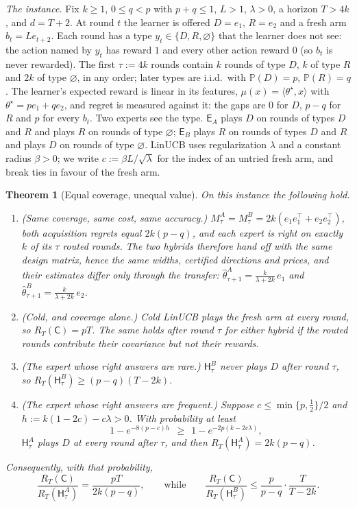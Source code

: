\documentclass{article}
\newtheorem{theorem}{Theorem}
\theoremstyle{definition}
\theoremstyle{remark}
\newcommand{\Prb}{\mathbb{P}}
\theoremstyle{remark}
\newcommand{\Cold}{\mathsf{C}}
\newcommand{\Exp}{\mathsf{E}}
\newcommand{\Hyb}{\mathsf{H}}
\begin{document}
\emph{The instance.} Fix $k\ge1$, $0\le q<p$ with $p+q\le1$, $L>1$,
$\lambda>0$, a horizon $T>4k$, and $d=T+2$. At round $t$ the learner is
offered $D=e_1$, $R=e_2$ and a fresh arm $b_t=Le_{t+2}$. Each round has a type
$y_t\in\{D,R,\varnothing\}$ that the learner does not see: the action named by
$y_t$ has reward $1$ and every other action reward $0$ (so $b_t$ is never
rewarded). The first $\tau:=4k$ rounds contain $k$ rounds of type $D$, $k$ of
type $R$ and $2k$ of type $\varnothing$, in any order; later types are
i.i.d.\ with $\Prb(D)=p$, $\Prb(R)=q$. The learner's expected reward is linear
in its features, $\mu(x)=\langle\theta^\star,x\rangle$ with
$\theta^\star=pe_1+qe_2$, and regret is measured against it: the gaps are
$0$ for $D$, $p-q$ for $R$ and $p$ for every $b_t$. Two experts see the type.
$\Exp_A$ plays $D$ on rounds of types $D$ and $R$ and plays $R$ on rounds of
type $\varnothing$; $\Exp_B$ plays $R$ on rounds of types $D$ and $R$ and plays
$D$ on rounds of type $\varnothing$. LinUCB uses regularization $\lambda$ and a
constant radius $\beta>0$; we write $c:=\beta L/\sqrt\lambda$ for the index of
an untried fresh arm, and break ties in favour of the fresh arm.

\begin{theorem}[Equal coverage, unequal value]
\label{thm:transfer-separation}
On this instance the following hold.
\begin{enumerate}[itemsep=1pt,topsep=1pt,leftmargin=*]
\item[(i)] \emph{(Same coverage, same cost, same accuracy.)}
$M_\tau^{A}=M_\tau^{B}=2k(e_1e_1^\top+e_2e_2^\top)$, both acquisition regrets
equal $2k(p-q)$, and each expert is right on exactly $k$ of its $\tau$ routed
rounds. The two hybrids therefore hand off with the same design matrix, hence
the same widths, certified directions and prices, and their estimates differ
only through the transfer:
$\widehat\theta^{A}_{\tau+1}=\frac{k}{\lambda+2k}\,e_1$ and
$\widehat\theta^{B}_{\tau+1}=\frac{k}{\lambda+2k}\,e_2$.
\item[(ii)] \emph{(Cold, and coverage alone.)} Cold LinUCB plays the fresh arm
at every round, so $R_T(\Cold)=pT$. The same holds after round $\tau$ for
either hybrid if the routed rounds contribute their covariance but not their
rewards.
\item[(iii)] \emph{(The expert whose right answers are rare.)}
$\Hyb^{B}_\tau$ never plays $D$ after round $\tau$, so
$R_T(\Hyb^{B}_\tau)\ge(p-q)(T-2k)$.
\item[(iv)] \emph{(The expert whose right answers are frequent.)} Suppose
$c\le\min\{p,\tfrac12\}/2$ and $h:=k(1-2c)-c\lambda>0$. With probability at
least
\[
1-e^{-8(p-c)h}\ \ \ge\ \ 1-e^{-2p(k-2c\lambda)},
\]
$\Hyb^{A}_\tau$ plays $D$ at every round after $\tau$, and then
$R_T(\Hyb^{A}_\tau)=2k(p-q)$.
\end{enumerate}
Consequently, with that probability,
\[
\frac{R_T(\Cold)}{R_T(\Hyb^{A}_\tau)}=\frac{pT}{2k(p-q)},
\qquad\text{while}\qquad
\frac{R_T(\Cold)}{R_T(\Hyb^{B}_\tau)}\le\frac{p}{p-q}\cdot\frac{T}{T-2k}.
\]
\end{theorem}
\end{document}
